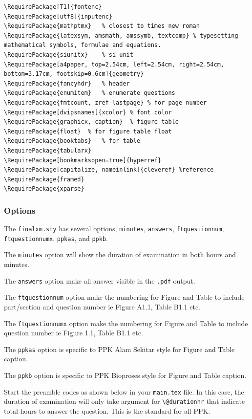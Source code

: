 \documentclass[12pt]{article}
\begin{document}
\begin{lstlisting}[basicstyle=\footnotesize, frame=single]
\RequirePackage[T1]{fontenc}
\RequirePackage[utf8]{inputenc}
\RequirePackage{mathptmx}	% closest to times new roman
\RequirePackage{latexsym, amsmath, amssymb, textcomp} % typesetting mathematical symbols, formulae and equations.
\RequirePackage{siunitx}	% si unit 
\RequirePackage[a4paper, top=2.54cm, left=2.54cm, right=2.54cm, bottom=3.17cm, footskip=0.6cm]{geometry}
\RequirePackage{fancyhdr}	% header
\RequirePackage{enumitem}	% enumerate questions
\RequirePackage{fmtcount, zref-lastpage} % for page number
\RequirePackage[dvipsnames]{xcolor}	% font color
\RequirePackage{graphicx, caption}	% figure table 
\RequirePackage{float}	% for figure table float
\RequirePackage{booktabs}	% for table
\RequirePackage{tabularx}
\RequirePackage[bookmarksopen=true]{hyperref}
\RequirePackage[capitalize, nameinlink]{cleveref} %reference
\RequirePackage{framed}	
\RequirePackage{xparse}
\end{lstlisting}

\subsubsection{Options}
The \verb|finalxm.sty| has several options, \verb|minutes|, \verb|answers|, \verb|ftquestionnum|, \verb|ftquestionnumx|, \verb|ppkas|, and \verb|ppkb|. 

\begin{framed}
The \verb|minutes| option will show the duration of examination in both hours and minutes. 

\smallskip 
The \verb|answers| option make all answer visible in the \verb|.pdf| output.

\smallskip 
The \verb|ftquestionnum| option make the numbering for Figure and Table to include part/section and question number ie Figure A1.1, Table B1.1 etc.  

\smallskip 
The \verb|ftquestionnumx| option make the numbering for Figure and Table to include question number ie Figure 1.1, Table B1.1 etc.  

\smallskip 
The \verb|ppkas| option is specific to PPK Alam Sekitar style for Figure and Table caption.

\smallskip 
The \verb|ppkb| option is specific to PPK Bioproses style for Figure and Table caption.
\end{framed}

Start the preamble codes as shown below in your \verb|main.tex| file. In this case, the duration of examination will only take argument for \verb|\@durationhr| that indicate total hours to answer the question. This is the standard for all PPK. 
\end{document}
